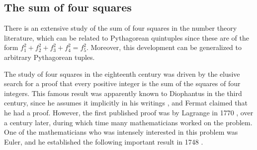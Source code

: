 \documentclass[12pt]{article}
\begin{document}
\subsection{The sum of four squares}

There is an extensive study of the sum of four squares in the 
number theory literature, which can be related to Pythagorean quintuples
since these are of the form $f_1^2 + f_2^2 + f_3^2 + f_4^2 = f_5^2$.
Moreover, this development can be generalized to arbitrary Pythagorean tuples.

The study of four squares in the eighteenth century
was driven by the elusive search for a proof that
every positive integer is the sum of the squares of four integers.
This famous result was apparently known to Diophantus in the third century,
since he assumes it implicitly in his writings \cite{dickson52}, %
and Fermat %
claimed that he had a proof.
However, the first published proof was by Lagrange in 1770 \cite{herstein75}, %
over a century later,
during which time many mathematicians worked on the problem.
One of the mathematicians who was intensely interested in this problem was Euler, 
and he established the following important result in 1748 \cite{weil84}.   
\end{document}
